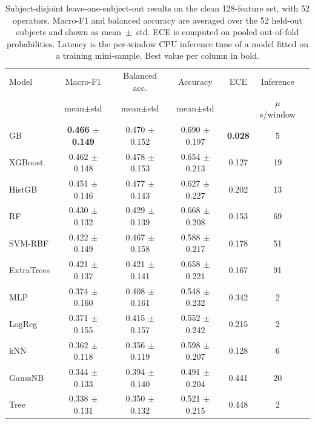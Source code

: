 \begin{table}[t]
\centering
\small
\caption{Subject-disjoint leave-one-subject-out results on the clean 128-feature
set, with 52 operators. Macro-F1 and balanced accuracy are averaged over the 52
held-out subjects and shown as mean~$\pm$~std. ECE is computed on pooled out-of-fold
probabilities. Latency is the per-window CPU inference time of a model fitted on a
training mini-sample. Best value per column in bold.}
\label{tab:benchmark}
\begin{tabular}{lcccccc}
\toprule
Model & Macro-F1 & Balanced acc. & Accuracy & ECE & Inference \\
 & mean$\pm$std & mean$\pm$std & mean$\pm$std & & $\mu$s/window \\
\midrule
GB & \textbf{0.466 $\pm$ 0.149} & 0.470 $\pm$ 0.152 & 0.690 $\pm$ 0.197 & \textbf{0.028} & 5 \\
XGBoost & 0.462 $\pm$ 0.148 & 0.478 $\pm$ 0.153 & 0.654 $\pm$ 0.213 & 0.127 & 19 \\
HistGB & 0.451 $\pm$ 0.146 & 0.477 $\pm$ 0.143 & 0.627 $\pm$ 0.227 & 0.202 & 13 \\
RF & 0.430 $\pm$ 0.132 & 0.429 $\pm$ 0.139 & 0.668 $\pm$ 0.208 & 0.153 & 69 \\
SVM-RBF & 0.422 $\pm$ 0.149 & 0.467 $\pm$ 0.158 & 0.588 $\pm$ 0.217 & 0.178 & 51 \\
ExtraTrees & 0.421 $\pm$ 0.137 & 0.421 $\pm$ 0.141 & 0.658 $\pm$ 0.221 & 0.167 & 91 \\
MLP & 0.374 $\pm$ 0.160 & 0.408 $\pm$ 0.161 & 0.548 $\pm$ 0.232 & 0.342 & 2 \\
LogReg & 0.371 $\pm$ 0.155 & 0.415 $\pm$ 0.157 & 0.552 $\pm$ 0.242 & 0.215 & 2 \\
kNN & 0.362 $\pm$ 0.118 & 0.356 $\pm$ 0.119 & 0.598 $\pm$ 0.207 & 0.128 & 6 \\
GaussNB & 0.344 $\pm$ 0.133 & 0.394 $\pm$ 0.140 & 0.491 $\pm$ 0.204 & 0.441 & 20 \\
Tree & 0.338 $\pm$ 0.131 & 0.350 $\pm$ 0.132 & 0.521 $\pm$ 0.215 & 0.448 & 2 \\
\bottomrule
\end{tabular}
\end{table}
